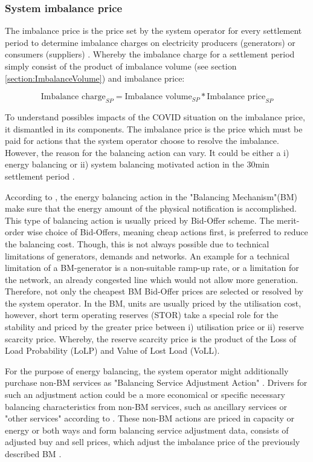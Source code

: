 \documentclass[energies,article,submit,moreauthors,pdftex]{Definitions/mdpi}
\begin{document}
\subsubsection{System imbalance price}\label{sec:system imbalance price}

The imbalance price is the price set by the system operator for every settlement period to determine imbalance charges on electricity producers (generators) or consumers (suppliers) \cite{ELEXON2019GuidanceBritain}. Whereby the imbalance charge for a settlement period simply consist of the product of imbalance volume (see section \ref{section:ImbalanceVolume}) and imbalance price:

\[ \text{Imbalance charge}_{SP} = \text{Imbalance volume}_{SP} * \text{Imbalance price}_{SP} \]

To understand possibles impacts of the COVID situation on the imbalance price, it dismantled in its components. The imbalance price is the price which must be paid for actions that the system operator choose to resolve the imbalance. However, the reason for the balancing action can vary. It could be either a i) energy balancing or ii) system balancing motivated action in the 30min settlement period \cite{ELEXON2019GuidanceBritain}. 

According to \cite{ELEXON2019GuidanceBritain}, the energy balancing action in the "Balancing Mechanism"(BM) make sure that the energy amount of the physical notification is accomplished. This type of balancing action is usually priced by Bid-Offer scheme. The merit-order wise choice of Bid-Offers, meaning cheap actions first, is preferred to reduce the balancing cost. Though, this is not always possible due to technical limitations of generators, demands and networks. An example for a technical limitation of a BM-generator is a non-suitable ramp-up rate, or a limitation for the network, an already congested line which would not allow more generation. Therefore, not only the cheapest BM Bid-Offer prices are selected or resolved by the system operator. In the BM, units are usually priced by the utilisation cost, however, short term operating reserves (STOR) take a special role for the stability and priced by the greater price between i) utilisation price or ii) reserve scarcity price. Whereby, the reserve scarcity price is the product of the Loss of Load Probability (LoLP) and Value of Lost Load (VoLL). 

For the purpose of energy balancing, the system operator might additionally purchase non-BM services as "Balancing Service Adjustment Action" \cite{Nationalgrid2017ProcurementSO}. Drivers for such an adjustment action could be a more economical or specific necessary balancing characteristics from non-BM services, such as ancillary services or "other services" according to \cite{Nationalgrid2018BalancingStatement}. These non-BM actions are priced in capacity or energy or both ways and form balancing service adjustment data, consists of adjusted buy and sell prices, which adjust the imbalance price of the previously described BM \cite{Nationalgrid2017ProcurementSO,Nationalgrid2018BalancingStatement}.
\end{document}
